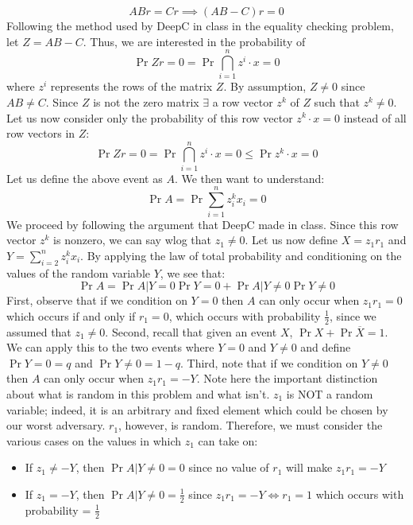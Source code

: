 \documentclass[12pt]{article}
\begin{document}
\begin{solution}
\begin{solution}
\begin{itemize}
    \[
    ABr = Cr \implies (AB-C)r = 0
    \]
    Following the method used by DeepC in class in the equality checking problem, let $Z = AB-C$. Thus, we are interested in the probability of
    \[
    \Pr{Zr = 0} = \Pr{\bigcap_{i=1}^n z^i \cdot x = 0}
    \]
    where $z^i$ represents the rows of the matrix $Z$. By assumption, $Z \neq 0$ since $AB \neq C$. Since $Z$ is not the zero matrix $\exists$ a row vector $z^k$ of $Z$ such that $z^k \neq 0$. Let us now consider only the probability of this row vector $z^k \cdot x = 0$ instead of all row vectors in $Z$:
    \[
    \Pr{Zr = 0} = \Pr{\bigcap_{i=1}^n z^i \cdot x = 0} \leq \Pr{z^k \cdot x = 0}
    \]
    Let us define the above event as $A$. We then want to understand:
    \[
    \Pr{A} = \Pr{\sum_{i=1}^n{z^{k}_{i}x_i} = 0}
    \]
    We proceed by following the argument that DeepC made in class. Since this row vector $z^k$ is nonzero, we can say wlog that $z_1 \neq 0$. Let us now define $X = z_1r_1$ and $Y=\sum_{i=2}^n{z^{k}_{i}x_i}$. By applying the law of total probability and conditioning on the values of the random variable $Y$, we see that:
    \[
    \Pr{A} = \Pr{A|Y=0}\Pr{Y=0} + \Pr{A|Y\neq0}\Pr{Y\neq0}
    \]
    First, observe that if we condition on $Y=0$ then $A$ can only occur when $z_1r_1 =0$ which occurs if and only if $r_1=0$, which occurs with probability $\frac{1}{2}$, since we assumed that $z_1 \neq 0$. Second, recall that given an event $X$, $\Pr{X} +\Pr{\overline{X}} = 1$. We can apply this to the two events where $Y=0$ and $Y\neq0$ and define $\Pr{Y=0} = q$ and $\Pr{Y\neq0} = 1-q$. Third, note that if we condition on $Y\neq0$ then $A$ can only occur when  $z_1r_1 =-Y$. Note here the important distinction about what is random in this problem and what isn't. $z_1$ is NOT a random variable; indeed, it is an arbitrary and fixed element which could be chosen by our worst adversary. $r_1$, however, is random. Therefore, we must consider the various cases on the values in which $z_1$ can take on:
    \begin{itemize}
        \item If $z_1 \neq -Y$, then $\Pr{A|Y\neq 0} = 0$ since no value of $r_1$ will make $z_1r_1=-Y$
        \item If $z_1 = -Y$, then $\Pr{A|Y\neq 0} = \frac{1}{2}$ since $z_1r_1=-Y \iff r_1=1$ which occurs with probability = $\frac{1}{2}$
    \end{itemize}
    

\end{itemize}
\end{solution}
\end{solution}
\end{document}
